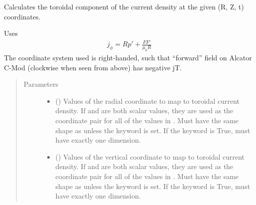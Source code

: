 \documentclass[letterpaper,10pt,english]{sphinxmanual}
\begin{document}
\begin{fulllineitems}
\begin{fulllineitems}
\begin{sphinxVerbatim}[commandchars=\\\{\}]
     
\end{sphinxVerbatim}

\end{fulllineitems}


\begin{fulllineitems}
\label{\detokenize{eqtools:eqtools.core.Equilibrium.rz2jT}}
Calculates the toroidal component of the current density at the given (R, Z, t) coordinates.

Uses
\begin{equation*}
\begin{split}j_\phi = Rp' + \frac{FF'}{\mu_0 R}\end{split}
\end{equation*}
The coordinate system used is right-handed, such that “forward” field on
Alcator C-Mod (clockwise when seen from above) has negative jT.
\begin{quote}\begin{description}
\item[{Parameters}] \leavevmode\begin{itemize}
\item {} 
 () \textendash{} Values of the radial coordinate to
map to toroidal current density. If  and  are both scalar
values, they are used as the coordinate pair for all of the
values in . Must have the same shape as  unless the
 keyword is set. If the  keyword is True,
 must have exactly one dimension.

\item {} 
 () \textendash{} Values of the vertical coordinate to
map to toroidal current density. If  and  are both scalar
values, they are used as the coordinate pair for all of the
values in . Must have the same shape as  unless the
 keyword is set. If the  keyword is True,
 must have exactly one dimension.


\end{itemize}
\end{description}
\end{quote}
\end{fulllineitems}
\end{fulllineitems}
\end{document}
